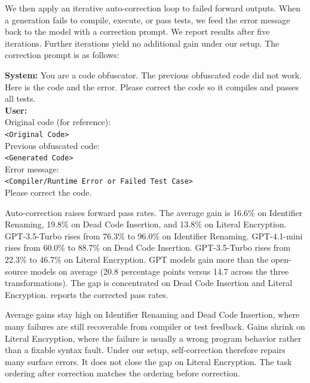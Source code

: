 We then apply an iterative auto-correction loop to failed forward outputs.
When a generation fails to compile, execute, or pass tests, we feed the error
message back to the model with a correction prompt. We report results after
five iterations. Further iterations yield no additional gain under our setup.
The correction prompt is as follows:

\begin{tcolorbox}[colback=red!5, colframe=red!25, coltitle=black,
  title=Self-Correction Prompt, boxrule=0.4pt, left=2pt, right=2pt,
  top=2pt, bottom=2pt, fontupper=\small]
\textbf{System:} You are a code obfuscator. The previous obfuscated code did
not work. Here is the code and the error. Please correct the code so it
compiles and passes all tests.\\
\vspace{0.2cm}
\textbf{User:} \\
Original code (for reference):\\
\texttt{<Original Code>}\\
\vspace{0.1cm}
Previous obfuscated code:\\
\texttt{<Generated Code>}\\
\vspace{0.1cm}
Error message:\\
\texttt{<Compiler/Runtime Error or Failed Test Case>}\\
\vspace{0.1cm}
Please correct the code.
\end{tcolorbox}

\noindent
Auto-correction raises forward pass rates. The average gain is 16.6\% on
Identifier Renaming, 19.8\% on Dead Code Insertion, and 13.8\% on Literal
Encryption. GPT-3.5-Turbo rises from 76.3\% to 96.0\% on Identifier Renaming.
GPT-4.1-mini rises from 60.0\% to 88.7\% on Dead Code Insertion.
GPT-3.5-Turbo rises from 22.3\% to 46.7\% on Literal Encryption.
GPT models gain more than the open-source models on average
(20.8 percentage points versus 14.7 across the three transformations).
The gap is concentrated on Dead Code Insertion and Literal Encryption.
 reports the corrected pass rates.

Average gains stay high on Identifier Renaming
and Dead Code Insertion, where many failures are still recoverable from
compiler or test feedback. Gains shrink on Literal Encryption, where the
failure is usually a wrong program behavior rather than a fixable syntax
fault.
Under our setup, self-correction therefore repairs many surface errors.
It does not close the gap on Literal Encryption. The task
ordering after correction matches the ordering before correction.

